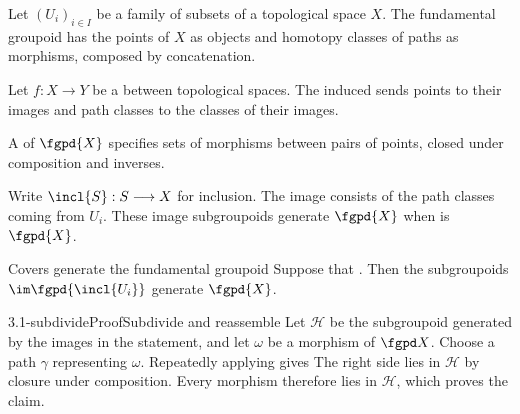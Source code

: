 Let $(U_i)_{i\in I}$ be a family of subsets of a topological space $X$.
The fundamental groupoid
 has the points of $X$ as objects
and homotopy classes of paths as morphisms, composed by concatenation.

Let $f:X\longrightarrow Y$ be a  between topological spaces.
The induced 
 sends points to their images
and path classes to the classes of their images.

A  of $\fgpd{X}$ specifies
sets of morphisms between pairs of points, closed under composition and
inverses.

Write $\incl{S}:S\longrightarrow X$ for inclusion.
The image 
consists of the path classes coming from $U_i$.  These image subgroupoids
generate $\fgpd{X}$ when
 is $\fgpd{X}$.

\begin{theorem}[id=3.1]{Covers generate the fundamental groupoid}
Suppose that \hypCoverFamily.  Then the subgroupoids $\im \fgpd{\incl{U_{i}}}$
generate $\fgpd{X}$.
\end{theorem}

\begin{proofpassage}{3.1-subdivide}{Proof}{Subdivide and reassemble}
Let $\mathcal H$ be the subgroupoid generated by the images in the
statement, and let $\omega$ be a morphism of $\fgpd X$.  Choose a path
$\gamma$ representing $\omega$.  
  Repeatedly applying  gives
The right side lies in $\mathcal H$ by closure under composition.  Every
morphism therefore lies in $\mathcal H$, which proves the claim.
\end{proofpassage}

